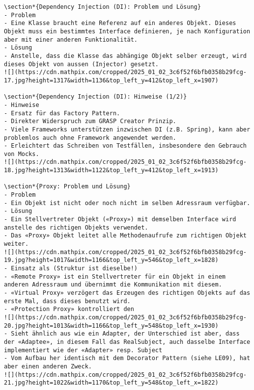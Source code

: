 \documentclass[10pt]{article}
\begin{document}
\begin{verbatim}
\section*{Dependency Injection (DI): Problem und Lösung}
- Problem
- Eine Klasse braucht eine Referenz auf ein anderes Objekt. Dieses Objekt muss ein bestimmtes Interface definieren, je nach Konfiguration aber mit einer anderen Funktionalität.
- Lösung
- Anstelle, dass die Klasse das abhängige Objekt selber erzeugt, wird dieses Objekt von aussen (Injector) gesetzt.
![](https://cdn.mathpix.com/cropped/2025_01_02_3c6f52f6bfb0358b29fcg-17.jpg?height=1317&width=1136&top_left_y=412&top_left_x=1907)

\section*{Dependency Injection (DI): Hinweise (1/2)}
- Hinweise
- Ersatz für das Factory Pattern.
- Direkter Widerspruch zum GRASP Creator Prinzip.
- Viele Frameworks unterstützen inzwischen DI (z.B. Spring), kann aber problemlos auch ohne Framework angewendet werden.
- Erleichtert das Schreiben von Testfällen, insbesondere den Gebrauch von Mocks.
![](https://cdn.mathpix.com/cropped/2025_01_02_3c6f52f6bfb0358b29fcg-18.jpg?height=1313&width=1122&top_left_y=412&top_left_x=1913)

\section*{Proxy: Problem und Lösung}
- Problem
- Ein Objekt ist nicht oder noch nicht im selben Adressraum verfügbar.
- Lösung
- Ein Stellvertreter Objekt («Proxy») mit demselben Interface wird anstelle des richtigen Objekts verwendet.
- Das «Proxy» Objekt leitet alle Methodenaufrufe zum richtigen Objekt weiter.
![](https://cdn.mathpix.com/cropped/2025_01_02_3c6f52f6bfb0358b29fcg-19.jpg?height=1017&width=1166&top_left_y=546&top_left_x=1828)
- Einsatz als (Struktur ist dieselbe!)
- «Remote Proxy» ist ein Stellvertreter für ein Objekt in einem anderen Adressraum und übernimmt die Kommunikation mit diesem.
- «Virtual Proxy» verzögert das Erzeugen des richtigen Objekts auf das erste Mal, dass dieses benutzt wird.
- «Protection Proxy» kontrolliert den
![](https://cdn.mathpix.com/cropped/2025_01_02_3c6f52f6bfb0358b29fcg-20.jpg?height=1013&width=1166&top_left_y=548&top_left_x=1930)
- Sieht ähnlich aus wie ein Adapter, der Unterschied ist aber, dass der «Adaptee», in diesem Fall das RealSubject, auch dasselbe Interface implementiert wie der «Adapter» resp. Subject
- Vom Aufbau her identisch mit dem Decorator Pattern (siehe LE09), hat aber einen anderen Zweck.
![](https://cdn.mathpix.com/cropped/2025_01_02_3c6f52f6bfb0358b29fcg-21.jpg?height=1022&width=1170&top_left_y=548&top_left_x=1822)


\end{verbatim}
\end{document}
